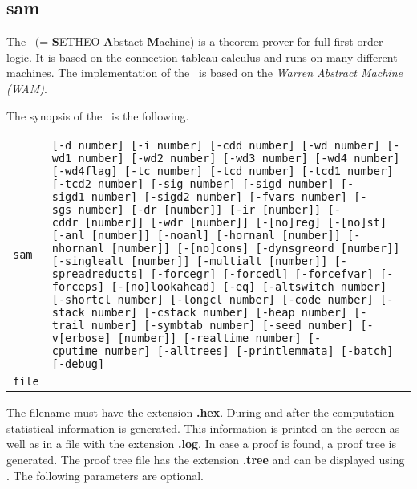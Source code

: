 %
\subsection{sam}\label{sec:sam}

The \SAM\ (= {\bf S}ETHEO {\bf A}bstact {\bf M}achine) is a theorem
prover for full first order logic. It is based  on  the  connection
tableau calculus and runs on many different machines. The implementation
of the \SAM\ is based on the {\em Warren Abstract Machine (WAM)}.

The synopsis of the \SAM\ is the following.

\begin{tabular}{lp{13.8cm}}
{\tt sam}   &  {\tt  [-d~number] [-i~number] [-cdd~number]
                     [-wd~number] [-wd1~number] [-wd2~number]
                     [-wd3~number] [-wd4~number] [-wd4flag]
                     [-tc~number] [-tcd~number] [-tcd1~number]
                     [-tcd2~number]
                     [-sig~number] [-sigd~number] [-sigd1~number]
                     [-sigd2~number]
                     [-fvars~number] [-sgs~number]
                     [-dr~[number]] [-ir~[number]] [-cddr~[number]]
                     [-wdr~[number]]
                     [-[no]reg] [-[no]st]
                     [-anl~[number]] [-noanl] [-hornanl~[number]]
                     [-nhornanl~[number]]
                     [-[no]cons]
                     [-dynsgreord~[number]]
                     [-singlealt~[number]] [-multialt~[number]]
                     [-spreadreducts] [-forcegr] [-forcedl]
                     [-forcefvar] [-forceps] [-[no]lookahead] [-eq]
                     [-altswitch~number] [-shortcl~number]
                     [-longcl~number]
                     [-code~number] [-stack~number] [-cstack~number]
                     [-heap~number] [-trail~number] [-symbtab~number]
                     [-seed~number]
                     [-v[erbose]~[number]]
                     [-realtime~number] [-cputime~number]
                     [-alltrees]
                     [-printlemmata]
                     [-batch] [-debug]} \\
{\tt file}  &
\end{tabular}

The filename must have the extension {\bf .hex}. During and after the
computation statistical information is generated. This
information is printed on the screen as well as in a file with the
extension {\bf .log}.
In case a proof is found, a proof tree is generated. The proof tree
file has the extension {\bf .tree} and can be displayed using \xp. 
The following parameters are optional.

